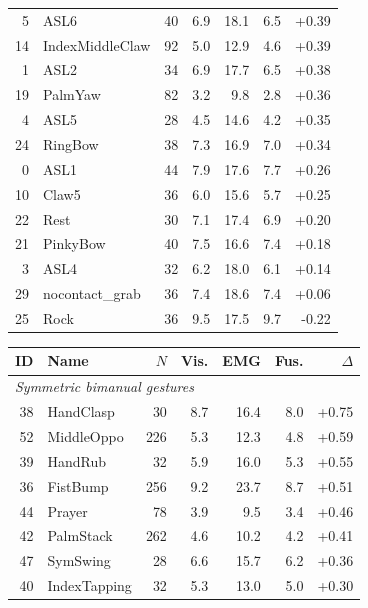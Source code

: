 \documentclass[letterpaper]{article} %
\begin{document}
\begin{table}[t]
\begin{minipage}[t]{0.48\textwidth}
\begin{tabular}{rlrrrrr}
5  & ASL6                    & 40  & 6.9 & 18.1 & 6.5 & +0.39 \\
14 & IndexMiddleClaw         & 92  & 5.0 & 12.9 & 4.6 & +0.39 \\
1  & ASL2                    & 34  & 6.9 & 17.7 & 6.5 & +0.38 \\
19 & PalmYaw                 & 82  & 3.2 & 9.8  & 2.8 & +0.36 \\
4  & ASL5                    & 28  & 4.5 & 14.6 & 4.2 & +0.35 \\
24 & RingBow                 & 38  & 7.3 & 16.9 & 7.0 & +0.34 \\
0  & ASL1                    & 44  & 7.9 & 17.6 & 7.7 & +0.26 \\
10 & Claw5                   & 36  & 6.0 & 15.6 & 5.7 & +0.25 \\
22 & Rest                    & 30  & 7.1 & 17.4 & 6.9 & +0.20 \\
21 & PinkyBow                & 40  & 7.5 & 16.6 & 7.4 & +0.18 \\
3  & ASL4                    & 32  & 6.2 & 18.0 & 6.1 & +0.14 \\
29 & nocontact\_grab          & 36  & 7.4 & 18.6 & 7.4 & +0.06 \\
25 & Rock                    & 36  & 9.5 & 17.5 & 9.7 & -0.22 \\
\bottomrule
\end{tabular}
\end{minipage}
\hfill
\begin{minipage}[t]{0.48\textwidth}
\centering
\begin{tabular}{rlrrrrr}
\toprule
ID & Name & $N$ & Vis. & EMG & Fus. & $\Delta$ \\
\midrule
\multicolumn{7}{l}{\textit{Symmetric bimanual gestures}} \\
38 & HandClasp       & 30  & 8.7 & 16.4 & 8.0 & +0.75 \\
52 & MiddleOppo      & 226 & 5.3 & 12.3 & 4.8 & +0.59 \\
39 & HandRub         & 32  & 5.9 & 16.0 & 5.3 & +0.55 \\
36 & FistBump        & 256 & 9.2 & 23.7 & 8.7 & +0.51 \\
44 & Prayer          & 78  & 3.9 & 9.5  & 3.4 & +0.46 \\
42 & PalmStack       & 262 & 4.6 & 10.2 & 4.2 & +0.41 \\
47 & SymSwing        & 28  & 6.6 & 15.7 & 6.2 & +0.36 \\
40 & IndexTapping    & 32  & 5.3 & 13.0 & 5.0 & +0.30 \\

\end{tabular}
\end{minipage}
\end{table}
\end{document}
